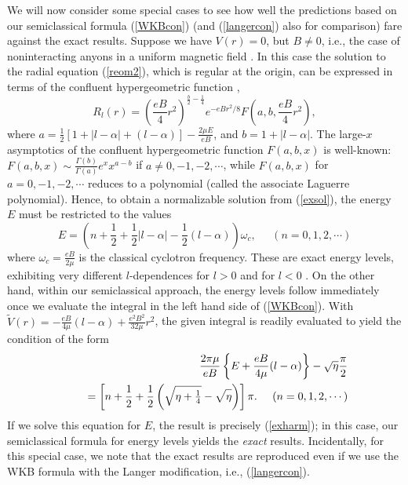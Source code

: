 \documentclass[a4paper,aps,eqsecnum,preprint,preprintnumbers,12pt]{revtex4}
\begin{document}
We will now consider some special cases to see how well the
predictions based on our semiclassical formula (\ref{WKBcon}) (and
(\ref{langercon}) also for comparison) fare against the exact
results. Suppose we have $V(r)=0$, but $B \neq 0$, i.e., the case
of noninteracting anyons in a uniform magnetic field
\cite{johnson, khare}. In this case the solution to the radial
equation (\ref{reom2}), which is regular at the origin, can be
expressed in terms of the confluent hypergeometric function
\cite{landau},
\begin{equation} \label{exsol}
R_{l}(r) = \left( \frac{eB}{4} r^{2} \right)^{ \frac{b}{2} -
\frac{1}{4} } e^{ - eBr^{2}/8 } F(a, b, \frac{eB}{4} r^{2}),
\end{equation}
where $a = \displaystyle \frac{1}{2} [ 1 + |l-\alpha| + (l-\alpha)
] - \frac{2\mu E}{eB}$, and $b = 1 + |l-\alpha|$. The large-$x$
asymptotics of the confluent hypergeometric function $F(a,b,x)$ is
well-known: $F(a,b,x) \sim \displaystyle
\frac{\Gamma(b)}{\Gamma(a)} e^{x} x^{a-b}$ if $a \neq 0, -1, -2,
\cdots$, while $F(a,b,x)$ for $a = 0, -1, -2, \cdots$ reduces to a
polynomial (called the associate Laguerre polynomial). Hence, to
obtain a normalizable solution from (\ref{exsol}), the energy $E$
must be restricted to the values
\begin{equation} \label{exharm}
E = \left( n + \frac{1}{2} + \frac{1}{2} |l-\alpha| - \frac{1}{2}
(l-\alpha) \right) \omega_{c}, \;\;\;\;\; ( n = 0, 1, 2, \cdots )
\end{equation}
where $\omega_{c} = \displaystyle \frac{eB}{2\mu}$ is the
classical cyclotron frequency. These are exact energy levels,
exhibiting very different $l$-dependences for $l>0$ and for $l<0$
\cite{khare, johnson}. On the other hand, within our semiclassical
approach, the energy levels follow immediately once we evaluate
the integral in the left hand side of (\ref{WKBcon}). With
$\tilde{V}(r) = - \displaystyle \frac{eB}{4\mu} (l-\alpha) +
\frac{e^{2}B^{2}}{32\mu} r^{2}$, the given integral is readily
evaluated to yield the condition of the form
\begin{eqnarray}
&& \frac{2\pi\mu}{eB} \left\{ E + \frac{eB}{4\mu} (l - \alpha)
\right\} - \sqrt{\eta} \frac{\pi}{2} \nonumber \\
&&\;\;\;\;\; = \left[ n + \frac{1}{2} + \frac{1}{2} \left( \sqrt{
\mathstrut \eta + \textstyle \frac{1}{4} } - \sqrt{ \mathstrut
\eta } \right) \right] \pi. \;\;\;\;\; ( n = 0, 1, 2, \cdots )
\end{eqnarray}
If we solve this equation for $E$, the result is precisely
(\ref{exharm}); in this case, our semiclassical formula for energy
levels yields the {\it exact} results. Incidentally, for this
special case, we note that the exact results are reproduced even
if we use the WKB formula with the Langer modification, i.e.,
(\ref{langercon}).
\end{document}
